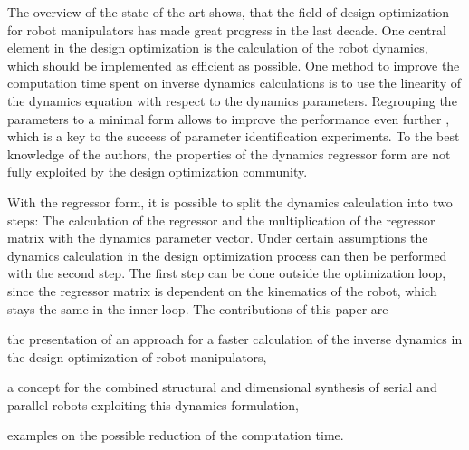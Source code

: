 \documentclass{svproc}
\begin{document}
The overview of the state of the art shows, that the field of design optimization for robot manipulators has made great progress in the last decade.
One central element in the design optimization is the calculation of the robot dynamics, which should be implemented as efficient as possible.
One method to improve the computation time spent on inverse dynamics calculations is to use the linearity of the dynamics equation with respect to the dynamics parameters.
Regrouping the parameters to a minimal form allows to improve the performance even further \cite{KhalilDom2002}, which is a key to the success of parameter identification experiments.
To the best knowledge of the authors, the properties of the dynamics regressor form are not fully exploited by the design optimization community.

With the regressor form, it is possible to split the dynamics calculation into two steps: The calculation of the regressor and the  multiplication of the regressor matrix with the dynamics parameter vector.
Under certain assumptions the dynamics calculation in the design optimization process can then be performed with the second step.
The first step can be done outside the optimization loop, since the regressor matrix is dependent on the kinematics of the robot, which stays the same in the inner loop.
%
The contributions of this paper are
\begin{compactitem}
    \item the presentation of an approach for a faster calculation of the inverse dynamics in the design optimization of robot manipulators,
    \item a concept for the combined structural and dimensional synthesis of serial and parallel robots exploiting this dynamics formulation,
    \item examples on the possible reduction of the computation time.
\end{compactitem}
\end{document}
